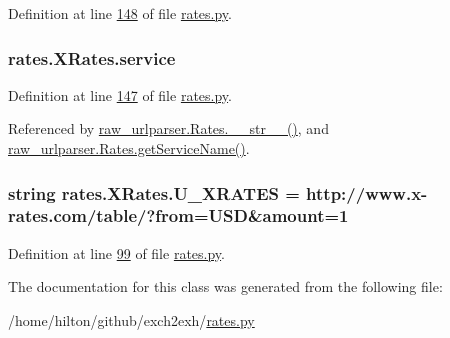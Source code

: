 Definition at line \hyperlink{rates_8py_source_l00148}{148} of file \hyperlink{rates_8py_source}{rates.\+py}.

\subsubsection[{\texorpdfstring{service}{service}}]{\setlength{\rightskip}{0pt plus 5cm}rates.\+X\+Rates.\+service}\hypertarget{classrates_1_1_x_rates_ad80e3c0295deaa15fac085324716747f}{}\label{classrates_1_1_x_rates_ad80e3c0295deaa15fac085324716747f}


Definition at line \hyperlink{rates_8py_source_l00147}{147} of file \hyperlink{rates_8py_source}{rates.\+py}.



Referenced by \hyperlink{raw__urlparser_8py_source_l00038}{raw\+\_\+urlparser.\+Rates.\+\_\+\+\_\+str\+\_\+\+\_\+()}, and \hyperlink{raw__urlparser_8py_source_l00035}{raw\+\_\+urlparser.\+Rates.\+get\+Service\+Name()}.

\subsubsection[{\texorpdfstring{U\+\_\+\+X\+R\+A\+T\+ES}{U_XRATES}}]{\setlength{\rightskip}{0pt plus 5cm}string rates.\+X\+Rates.\+U\+\_\+\+X\+R\+A\+T\+ES = \textquotesingle{}http\+://www.\+x-\/rates.\+com/table/?from=U\+SD\&amount=1\textquotesingle{}\hspace{0.3cm}{\ttfamily [static]}}\hypertarget{classrates_1_1_x_rates_ab3bd64c08e6503f0d76c9f73dc38fa25}{}\label{classrates_1_1_x_rates_ab3bd64c08e6503f0d76c9f73dc38fa25}


Definition at line \hyperlink{rates_8py_source_l00099}{99} of file \hyperlink{rates_8py_source}{rates.\+py}.



The documentation for this class was generated from the following file\+:\begin{DoxyCompactItemize}
\item 
/home/hilton/github/exch2exh/\hyperlink{rates_8py}{rates.\+py}\end{DoxyCompactItemize}
